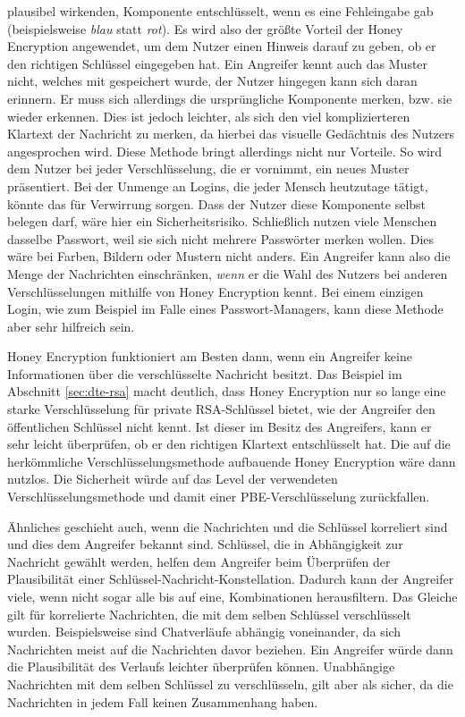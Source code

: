 plausibel wirkenden, Komponente entschlüsselt, wenn es eine Fehleingabe gab (beispielsweise \emph{blau} statt \emph{rot}). Es wird also der größte Vorteil der Honey Encryption angewendet, um dem Nutzer einen Hinweis darauf zu geben, ob er den richtigen Schlüssel eingegeben hat. Ein Angreifer kennt auch das Muster nicht, welches mit gespeichert wurde, der Nutzer hingegen kann sich daran erinnern. Er muss sich allerdings die ursprüngliche Komponente merken, bzw. sie wieder erkennen. Dies ist jedoch leichter, als sich den viel komplizierteren Klartext der Nachricht zu merken, da hierbei das visuelle Gedächtnis des Nutzers angesprochen wird. Diese Methode bringt allerdings nicht nur Vorteile. So wird dem Nutzer bei jeder Verschlüsselung, die er vornimmt, ein neues Muster präsentiert. Bei der Unmenge an Logins, die jeder Mensch heutzutage tätigt, könnte das für Verwirrung sorgen. Dass der Nutzer diese Komponente selbst belegen darf, wäre hier ein Sicherheitsrisiko. Schließlich nutzen viele Menschen dasselbe Passwort, weil sie sich nicht mehrere Passwörter merken wollen. Dies wäre bei Farben, Bildern oder Mustern nicht anders. Ein Angreifer kann also die Menge der Nachrichten einschränken, \emph{wenn} er die Wahl des Nutzers bei anderen Verschlüsselungen mithilfe von Honey Encryption kennt. Bei einem einzigen Login, wie zum Beispiel im Falle eines Passwort-Managers, kann diese Methode aber sehr hilfreich sein.

Honey Encryption funktioniert am Besten dann, wenn ein Angreifer keine Informationen über die verschlüsselte Nachricht besitzt. Das Beispiel im Abschnitt \ref{sec:dte-rsa} macht deutlich, dass Honey Encryption nur so lange eine starke Verschlüsselung für private RSA-Schlüssel bietet, wie der Angreifer den öffentlichen Schlüssel nicht kennt. Ist dieser im Besitz des Angreifers, kann er sehr leicht überprüfen, ob er den richtigen Klartext entschlüsselt hat. Die auf die herkömmliche Verschlüsselungsmethode aufbauende Honey Encryption wäre dann nutzlos. Die Sicherheit würde auf das Level der verwendeten Verschlüsselungsmethode und damit einer PBE-Verschlüsselung zurückfallen.

Ähnliches geschieht auch, wenn die Nachrichten und die Schlüssel korreliert sind und dies dem Angreifer bekannt sind. Schlüssel, die in Abhängigkeit zur Nachricht gewählt werden, helfen dem Angreifer beim Überprüfen der Plausibilität einer Schlüssel-Nachricht-Konstellation. Dadurch kann der Angreifer viele, wenn nicht sogar alle bis auf eine, Kombinationen herausfiltern. Das Gleiche gilt für korrelierte Nachrichten, die mit dem selben Schlüssel verschlüsselt wurden. Beispielsweise sind Chatverläufe abhängig voneinander, da sich Nachrichten meist auf die Nachrichten davor beziehen. Ein Angreifer würde dann die Plausibilität des Verlaufs leichter überprüfen können. Unabhängige Nachrichten mit dem selben Schlüssel zu verschlüsseln, gilt aber als sicher, da die Nachrichten in jedem Fall keinen Zusammenhang haben.